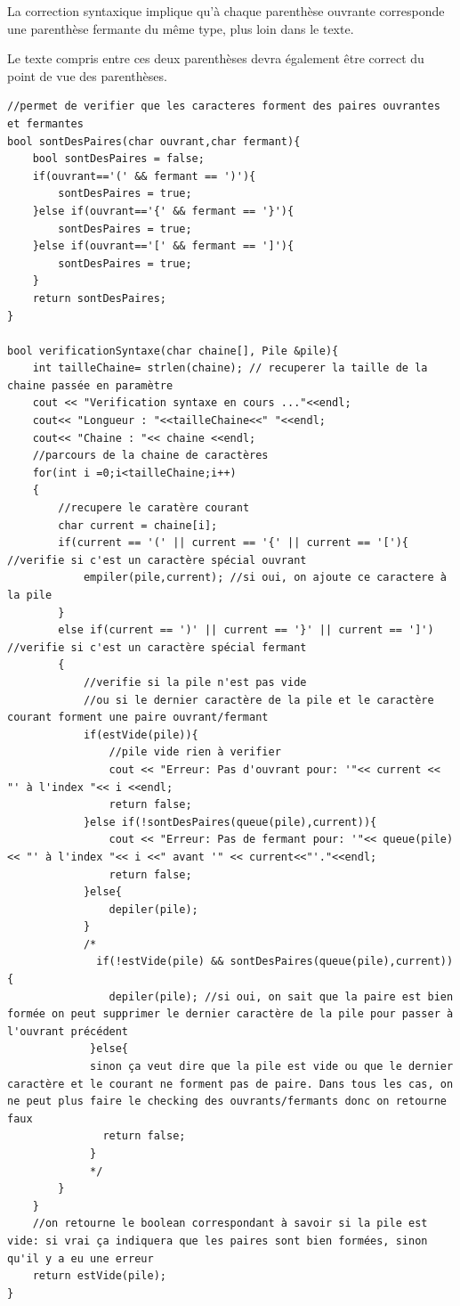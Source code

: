 \documentclass[french]{article}
\begin{document}
La correction syntaxique implique qu’à chaque parenthèse ouvrante corresponde une parenthèse fermante du même type, plus loin dans le texte.


Le texte compris entre ces deux parenthèses devra également être correct du point de vue des parenthèses.

\begin{lstlisting}[caption={Aide pour Verification syntaxe},label=aide]
//permet de verifier que les caracteres forment des paires ouvrantes et fermantes
bool sontDesPaires(char ouvrant,char fermant){
    bool sontDesPaires = false;
    if(ouvrant=='(' && fermant == ')'){
        sontDesPaires = true;
    }else if(ouvrant=='{' && fermant == '}'){
        sontDesPaires = true;
    }else if(ouvrant=='[' && fermant == ']'){
        sontDesPaires = true;
    }
    return sontDesPaires;
}

bool verificationSyntaxe(char chaine[], Pile &pile){
    int tailleChaine= strlen(chaine); // recuperer la taille de la chaine passée en paramètre
    cout << "Verification syntaxe en cours ..."<<endl;
    cout<< "Longueur : "<<tailleChaine<<" "<<endl;
    cout<< "Chaine : "<< chaine <<endl;
    //parcours de la chaine de caractères
    for(int i =0;i<tailleChaine;i++)
    {
        //recupere le caratère courant
        char current = chaine[i];
        if(current == '(' || current == '{' || current == '['){ //verifie si c'est un caractère spécial ouvrant
            empiler(pile,current); //si oui, on ajoute ce caractere à la pile
        }
        else if(current == ')' || current == '}' || current == ']') //verifie si c'est un caractère spécial fermant
        {
            //verifie si la pile n'est pas vide
            //ou si le dernier caractère de la pile et le caractère courant forment une paire ouvrant/fermant
            if(estVide(pile)){
                //pile vide rien à verifier
                cout << "Erreur: Pas d'ouvrant pour: '"<< current << "' à l'index "<< i <<endl;
                return false;
            }else if(!sontDesPaires(queue(pile),current)){
                cout << "Erreur: Pas de fermant pour: '"<< queue(pile) << "' à l'index "<< i <<" avant '" << current<<"'."<<endl;
                return false;
            }else{
                depiler(pile);
            }
            /*
              if(!estVide(pile) && sontDesPaires(queue(pile),current)){
                depiler(pile); //si oui, on sait que la paire est bien formée on peut supprimer le dernier caractère de la pile pour passer à l'ouvrant précédent
             }else{
             sinon ça veut dire que la pile est vide ou que le dernier caractère et le courant ne forment pas de paire. Dans tous les cas, on ne peut plus faire le checking des ouvrants/fermants donc on retourne faux
               return false;
             }
             */
        }
    }
    //on retourne le boolean correspondant à savoir si la pile est vide: si vrai ça indiquera que les paires sont bien formées, sinon qu'il y a eu une erreur
    return estVide(pile);
}
\end{lstlisting}
\end{document}
